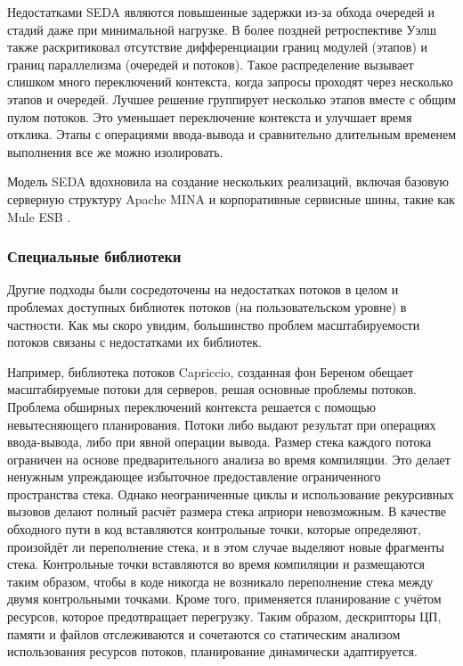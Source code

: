 Недостатками SEDA являются повышенные задержки из-за обхода очередей и стадий даже при минимальной нагрузке. В более поздней ретроспективе Уэлш также раскритиковал отсутствие дифференциации границ модулей (этапов) и границ параллелизма (очередей и потоков). Такое распределение вызывает слишком много переключений контекста, когда запросы проходят через несколько этапов и очередей. Лучшее решение группирует несколько этапов вместе с общим пулом потоков. Это уменьшает переключение контекста и улучшает время отклика. Этапы с операциями ввода-вывода и сравнительно длительным временем выполнения все же можно изолировать.

Модель SEDA вдохновила на создание нескольких реализаций, включая базовую серверную структуру Apache MINA \cite{mina} и корпоративные сервисные шины, такие как Mule ESB \cite{mulesoft}.

\subsubsection{Специальные библиотеки}

Другие подходы были сосредоточены на недостатках потоков в целом и проблемах доступных библиотек потоков (на пользовательском уровне) в частности. Как мы скоро увидим, большинство проблем масштабируемости потоков связаны с недостатками их библиотек.

Например, библиотека потоков Capriccio, созданная фон Береном обещает масштабируемые потоки для серверов, решая основные проблемы потоков. Проблема обширных переключений контекста решается с помощью невытесняющего планирования. Потоки либо выдают результат при операциях ввода-вывода, либо при явной операции вывода. Размер стека каждого потока ограничен на основе предварительного анализа во время компиляции. Это делает ненужным упреждающее избыточное предоставление ограниченного пространства стека. Однако неограниченные циклы и использование рекурсивных вызовов делают полный расчёт размера стека априори невозможным. В качестве обходного пути в код вставляются контрольные точки, которые определяют, произойдёт ли переполнение стека, и в этом случае выделяют новые фрагменты стека. Контрольные точки вставляются во время компиляции и размещаются таким образом, чтобы в коде никогда не возникало переполнение стека между двумя контрольными точками. Кроме того, применяется планирование с учётом ресурсов, которое предотвращает перегрузку. Таким образом, дескрипторы ЦП, памяти и файлов отслеживаются и сочетаются со статическим анализом использования ресурсов потоков, планирование динамически адаптируется.

